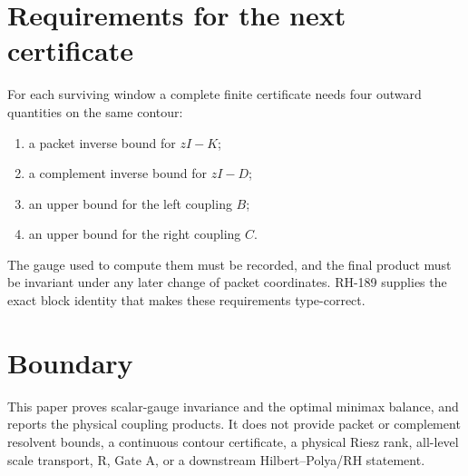 \documentclass[12pt]{article}
\theoremstyle{remark}
\begin{document}
\section{Requirements for the next certificate}

For each surviving window a complete finite certificate needs four outward
quantities on the same contour:
\begin{enumerate}[leftmargin=2em]
\item a packet inverse bound for $zI-K$;
\item a complement inverse bound for $zI-D$;
\item an upper bound for the left coupling $B$;
\item an upper bound for the right coupling $C$.
\end{enumerate}
The gauge used to compute them must be recorded, and the final product must
be invariant under any later change of packet coordinates.  RH-189 supplies
the exact block identity that makes these requirements type-correct.

\section{Boundary}

This paper proves scalar-gauge invariance and the optimal minimax balance,
and reports the physical coupling products.  It does not provide packet or
complement resolvent bounds, a continuous contour certificate, a physical
Riesz rank, all-level scale transport, R, Gate A, or a downstream
Hilbert--Polya/RH statement.



\end{document}
